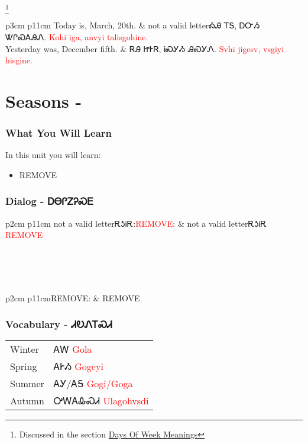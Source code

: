 \footnote{Discussed in the section \hyperref[sec:daysOfWeekMeaning]{Days Of Week Meanings}}\begin{minipage}{\linewidth}
\begin{tabular}{p{3cm} p{11cm}}
Today is, March, 20th. & not a valid letterᎣᎯ ᎢᎦ, ᎠᏅᏱ ᏔᎵᏍᎪᎯᏁ. 
 \newline \textcolor{red}{Kohi iga, anvyi talisgohine.}\\
Yesterday was, December fifth. & ᏒᎯ ᏥᎨᏒ, ᎥᏍᎩᏱ ᎯᏍᎩᏁ. 
 \newline \textcolor{red}{Svhi jigesv, vsgiyi hisgine.}\\
\end{tabular}
\end{minipage}

\cite{walc1pp48}
\index{}
\chapter{Seasons - }
\subsection{What You Will Learn}
In this unit you will learn:
\begin{itemize}
\item REMOVE
\end{itemize}\newpage

\newpage\subsection{Dialog - ᎠᎾᎵᏃᎮᏍᎬ}
\begin{tabular}{p{2cm} p{11cm}}
not a valid letterᎡᎼᎥᎡ:\newline \textcolor{red}{REMOVE}: & not a valid letterᎡᎼᎥᎡ 
\newline\textcolor{red}{REMOVE}\\
\end{tabular}
\\
\\
\\
\noindent\begin{tabular}{p{2cm} p{11cm}}REMOVE: & REMOVE\\
\end{tabular}
\vfill\newpage\subsection{Vocabulary - ᏗᎧᏁᎢᏍᏗ 
}
\begin{minipage}{\linewidth}
\begin{tabular}{p{3cm} p{11cm}}
Winter & ᎪᎳ 
 \newline \textcolor{red}{Gola}\\
Spring & ᎪᎨᏱ 
 \newline \textcolor{red}{Gogeyi}\\
Summer & ᎪᎩ/ᎪᎦ 
 \newline \textcolor{red}{Gogi/Goga}\\
Autumn & ᎤᎳᎪᎲᏍᏗ 
 \newline \textcolor{red}{Ulagohvsdi}\\
\end{tabular}
\end{minipage}

